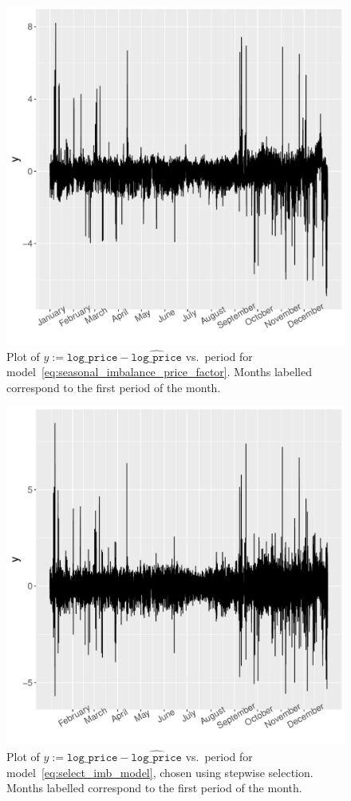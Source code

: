 \documentclass[11pt,twoside,openany]{book}
\newcommand{\code}[1]{\texttt{#1}}
\numberwithin{Theorem}{chapter}
\numberwithin{Definition}{chapter}
\numberwithin{Lemma}{chapter}
\numberwithin{Algorithm}{chapter}
\numberwithin{equation}{chapter}
\begin{document}
\begin{figure}[htp]
  \centering
  \includegraphics[scale=0.6]{../elexon/figures/y_resid.pdf}
  \caption{Plot of $y :=\code{log_price} - \widehat{\code{log_price}}$ vs.\ period
  for model~\eqref{eq:seasonal_imbalance_price_factor}. Months labelled
correspond to the first period of the month.}\label{fig:lprice_res_simple}
\end{figure}

\begin{figure}[htp]
  \centering
  \includegraphics[scale=0.60]{../elexon/figures/y_lm_final.pdf}
  \caption{Plot of $y :=\code{log_price} - \widehat{\code{log_price}}$ vs.\ period for model~\eqref{eq:select_imb_model}, chosen using stepwise selection. Months labelled
correspond to the first period of the month.}\label{fig:lprice_res_stepwise}
\end{figure}
\FloatBarrier
\end{document}
